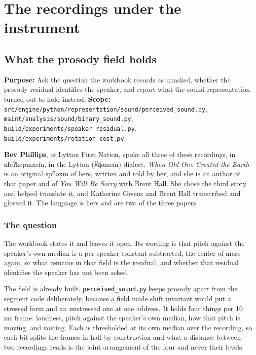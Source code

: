 \chapter{The recordings under the instrument}

\section{What the prosody field holds}

\textbf{Purpose:} Ask the question the workbook records as unasked, whether the prosody residual
identifies the speaker, and report what the sound representation turned out to hold instead.
\textbf{Scope:}
\texttt{src/\allowbreak{}engine/\allowbreak{}python/\allowbreak{}representation/\allowbreak{}sound/\allowbreak{}perceived\_\allowbreak{}sound.\allowbreak{}py},
\texttt{maint/\allowbreak{}analysis/\allowbreak{}sound/\allowbreak{}binary\_\allowbreak{}sound.\allowbreak{}py},
\texttt{build/\allowbreak{}experiments/\allowbreak{}speaker\_\allowbreak{}residual.\allowbreak{}py},
\texttt{build/\allowbreak{}experiments/\allowbreak{}rotation\_\allowbreak{}cost.\allowbreak{}py}.

\textbf{Bev Phillips}, of Lytton First Nation, spoke all three of these recordings, in
nɬeʔkepmxcín, in the Lytton (ƛ̓q̓əmcín) dialect. \emph{When Old One Created the Earth} is an
original spíləx̣m of hers, written and told by her, and she is an author of that paper and of
\emph{You Will Be Sorry} with Brent Hall. She chose the third story and helped translate it, and
Katherine Givens and Brent Hall transcribed and glossed it. The language is hers and are two of
the three papers.

\subsection{The question}

The workbook states it and leaves it open. Its wording is that pitch against the speaker's own median
is a per-speaker constant subtracted, the center of mass again, so what remains in that
field is the residual, and whether that residual identifies the speaker has not been asked.

The field is already built.
\texttt{perceived\_\allowbreak{}sound.\allowbreak{}py} keeps prosody apart from the segment code
deliberately, because a field made shift invariant would put a stressed form and an unstressed one
at one address. It holds four things per 10 ms frame: loudness, pitch against the speaker's own
median, how that pitch is moving, and voicing. Each is thresholded at its own median over the
recording, so each bit splits the frames in half by construction and what a distance between two
recordings reads is the joint arrangement of the four and never their levels.

